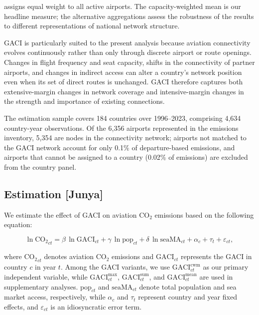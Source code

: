 \documentclass[12pt]{extarticle}
\begin{document}
assigns equal weight to all active airports. The capacity-weighted mean is our headline measure; the alternative aggregations assess the robustness of the results to different representations of national network structure.

GACI is particularly suited to the present analysis because aviation connectivity evolves continuously rather than only through discrete airport or route openings. Changes in flight frequency and seat capacity, shifts in the connectivity of partner airports, and changes in indirect access can alter a country's network position even when its set of direct routes is unchanged. GACI therefore captures both extensive-margin changes in network coverage and intensive-margin changes in the strength and importance of existing connections.

The estimation sample covers 184 countries over 1996--2023, comprising 4,634 country-year observations. Of the 6,356 airports represented in the emissions inventory, 5,354 are nodes in the connectivity network; airports not matched to the GACI network account for only 0.1\% of departure-based emissions, and airports that cannot be assigned to a country (0.02\% of emissions) are excluded from the country panel.




\subsection*{Estimation [Junya]}
We estimate the effect of GACI on aviation CO$_2$ emissions based on the following equation:

\begin{equation}
\ln \mathrm{CO_2}_{ct} = \beta \,\ln \mathrm{GACI}_{ct}
 + \gamma \,\ln \mathrm{pop}_{ct} + \delta \,\ln \mathrm{seaMA}_{ct}
 + \alpha_c + \tau_t + \varepsilon_{ct},
\label{eq:main}
\end{equation}

where $\mathrm{CO_2}_{ct}$ denotes aviation CO$_2$ emissions and $\mathrm{GACI}_{ct}$ represents the GACI in country $c$ in year $t$. Among the GACI variants, we use $\mathrm{GACI}^{\mathrm{cwm}}_{ct}$ as our primary independent variable, while $\mathrm{GACI}^{\mathrm{max}}_{ct}$, $\mathrm{GACI}^{\mathrm{sum}}_{ct}$, and $\mathrm{GACI}^{\mathrm{mean}}_{ct}$ are used in supplementary analyses. $\mathrm{pop}_{ct}$ and $\mathrm{seaMA}_{ct}$ denote total population and sea market access, respectively, while $\alpha_c$ and $\tau_t$ represent country and year fixed effects, and $\varepsilon_{ct}$ is an idiosyncratic error term.
\end{document}

